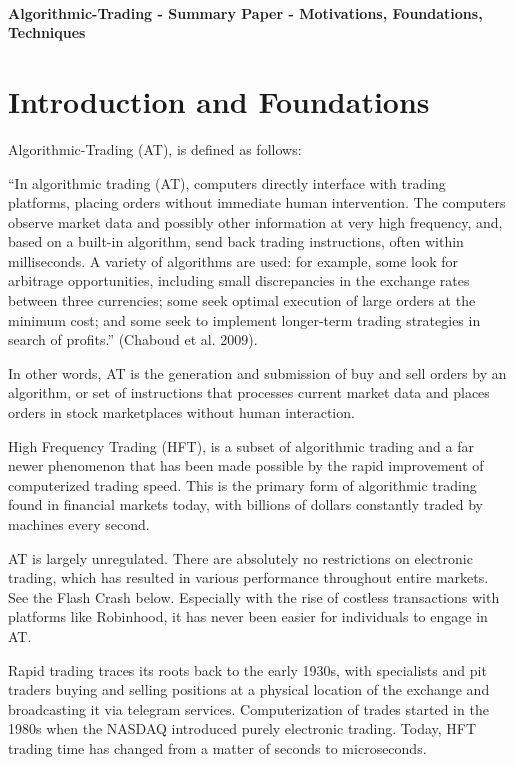 \documentclass[letterpaper,11pt]{article}
\begin{document}
\thispagestyle{plain}


 \\

\noindent\textbf{Algorithmic-Trading - Summary Paper - Motivations, Foundations, Techniques}

\section*{Introduction and Foundations}

Algorithmic-Trading (AT), is defined as follows: \begin{displayquote} ``In algorithmic trading (AT), computers directly interface with trading platforms, placing orders without immediate human intervention. The computers observe market data and possibly other information at very high frequency, and, based on a
built-in algorithm, send back trading instructions, often within milliseconds. A
variety of algorithms are used: for example, some look for arbitrage opportunities,
including small discrepancies in the exchange rates between three currencies; some
seek optimal execution of large orders at the minimum cost; and some seek to
implement longer-term trading strategies in search of profits.'' (Chaboud et al.
2009). \end{displayquote} In other words, AT is the generation and submission of buy and sell orders by an algorithm, or set of instructions that processes current market data and places orders in stock marketplaces without human interaction. 

High Frequency Trading (HFT), is a subset of algorithmic trading and a far newer phenomenon that has been made possible by the rapid improvement of computerized trading speed. This is the primary form of algorithmic trading found in financial markets today, with billions of dollars constantly traded by machines every second. 

AT is largely unregulated. There are absolutely no restrictions on electronic trading, which has resulted in various performance throughout entire markets. See the Flash Crash below. Especially with the rise of costless transactions with platforms like Robinhood, it has never been easier for individuals to engage in AT. 

Rapid trading traces its roots back to the early 1930s, with specialists and pit traders buying and selling positions at a physical location of the exchange and broadcasting it via telegram services.  Computerization of trades started in the 1980s when the NASDAQ introduced purely electronic trading. Today, HFT trading time has changed from a matter of seconds to microseconds. 
\end{document}
